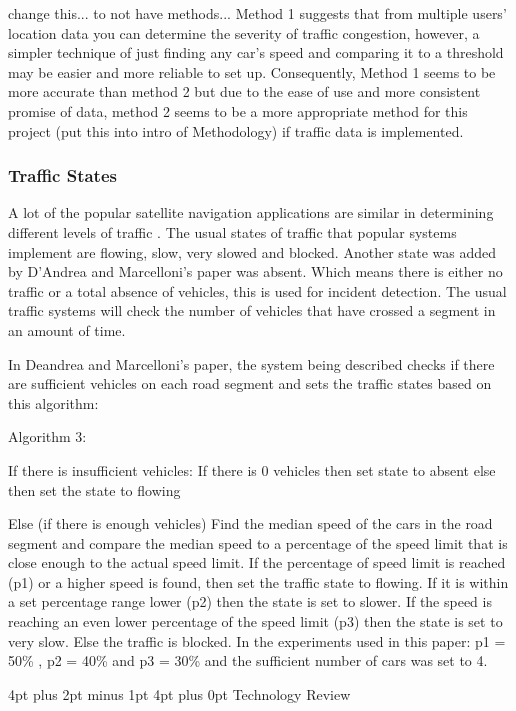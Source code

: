\documentclass[12pt,a4paper]{article}
\makeatletter
\renewcommand\section{\@startsection {section}{1}{0mm} %
                               {4pt plus 2pt minus 1pt} %
                               {4pt plus 0pt} %
                               {\Large\bfseries}}
\makeatother
\begin{document}
change this... to not have methods...
Method 1 suggests that from multiple users’ location data you can determine the severity of traffic congestion, however, a simpler technique of just finding any car’s speed and comparing it to a threshold may be easier and more reliable to set up. Consequently, Method 1 seems to be more accurate than method 2 but due to the ease of use and more consistent promise of data, method 2 seems to be a more appropriate method for this project (put this into intro of Methodology) if traffic data is implemented.

\subsubsection{Traffic States}

A lot of the popular satellite navigation applications are similar in determining different levels of traffic \cite{DAndrea2017}. The usual states of traffic that popular systems implement are flowing, slow, very slowed and blocked. Another state was added by D’Andrea and Marcelloni’s paper was absent. Which means there is either no traffic or a total absence of vehicles, this is used for incident detection. The usual traffic systems will check the number of vehicles that have crossed a segment in an amount of time.

In Deandrea and Marcelloni’s paper, the system being described checks if there are sufficient vehicles on each road segment and sets the traffic states based on this algorithm:

Algorithm 3:

If there is insufficient vehicles:
If there is 0 vehicles then set state to absent
else then set the state to flowing

Else (if there is enough vehicles)
  Find the median speed of the cars in the road segment and compare the median speed to a percentage of the speed limit that is close enough to the actual speed limit.
  If the percentage of speed limit is reached (p1) or a higher speed is found, then set the traffic state to flowing.
  If it is within a set percentage range lower (p2) then the state is set to slower.
  If the speed is reaching an even lower percentage of the speed limit (p3) then the state is set to very slow.
  Else the traffic is blocked.
  In the experiments used in this paper: p1 = 50\% , p2 = 40\% and p3 = 30\% and the sufficient number of cars was set to 4.
 

\section{Technology Review}
\end{document}

